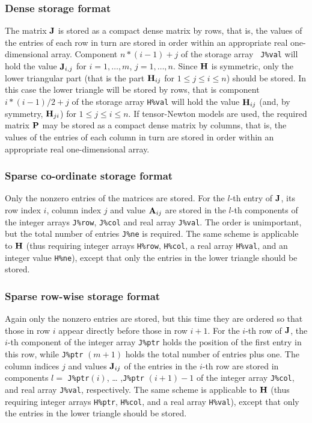 \documentclass{galahad}
\begin{document}
\subsubsection{Dense storage format}\label{dense}
The matrix ${\mathbf{J}}$ is stored as a compact
dense matrix by rows, that is, the values of the entries of each row in turn are
stored in order within an appropriate real one-dimensional array.
Component $n \ast (i-1) + j$ of the storage array {\tt
  J\%val} will hold the value ${\mathbf{J}}_{i,j}$ for $i = 1, \ldots , m$, $j =
1, \ldots , n$.  Since ${\mathbf{H}}$ is symmetric, only the lower triangular
part (that is the part ${\mathbf{H}}_{ij}$ for $1 \leq j \leq i \leq n$)
should be stored. In this case the lower triangle will be stored by rows,
that is component $i \ast (i-1)/2 + j$ of the storage array {\tt H\%val} will
hold the value ${\mathbf{H}}_{ij}$ (and, by symmetry, ${\mathbf{H}}_{ji}$) for $1 \leq j
\leq i \leq n$. If tensor-Newton models are used, the required matrix ${\mathbf{P}}$
may be stored as a compact dense matrix by columns, that is, the values of
the entries of each column in turn are stored in order within an appropriate
real one-dimensional array.

\subsubsection{Sparse co-ordinate storage format}\label{coordinate}
Only the nonzero entries of the matrices are stored. For the $l$-th
entry of ${\mathbf{J}}$, its row index $i$, column index $j$ and value
${\mathbf{A}}_{ij}$ are stored in the $l$-th components of the integer arrays
{\tt J\%row}, {\tt J\%col} and real array {\tt J\%val}.
The order is unimportant, but the total number of entries {\tt J\%ne} is
required.  The same scheme is applicable to ${\mathbf{H}}$
(thus requiring integer arrays {\tt H\%row}, {\tt H\%col}, a real
array {\tt H\%val}, and an integer value {\tt H\%ne}), except that only
the entries in the lower triangle should be stored.


\subsubsection{Sparse row-wise storage format}\label{rowwise}
Again only the nonzero entries are stored, but this time they are
ordered so that those in row $i$ appear directly before those in row
$i+1$. For the $i$-th row of ${\mathbf{J}}$, the $i$-th component of the integer
array {\tt J\%ptr} holds the position of the first entry in this row,
while {\tt J\%ptr} $(m+1)$ holds the total number of entries plus one.
The column indices $j$ and values ${\mathbf{J}}_{ij}$ of the entries in the
$i$-th row are stored in components $l =$ {\tt J\%ptr}$(i)$, \ldots
,{\tt J\%ptr} $(i+1)-1$ of the integer array {\tt J\%col}, and real
array {\tt J\%val}, respectively.
The same scheme is applicable to
${\mathbf{H}}$ (thus requiring integer arrays {\tt H\%ptr}, {\tt H\%col}, and
a real array {\tt H\%val}),
except that only the entries in the lower triangle should be stored.
\end{document}
